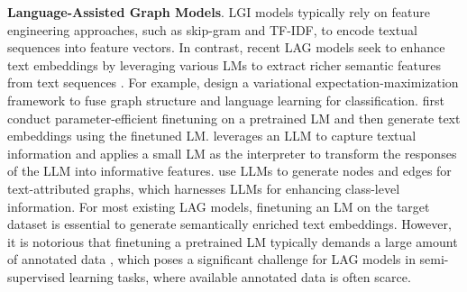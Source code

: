 \textbf{Language-Assisted Graph Models}.
LGI models typically rely on feature engineering approaches, such as skip-gram and TF-IDF, to encode textual sequences into feature vectors. 
In contrast, recent LAG models seek to enhance text embeddings by leveraging various LMs to extract richer semantic features from text sequences \citep{li2024surveygraphmeetslarge}.
For example, \cite{GLEM} design a variational expectation-maximization framework to fuse graph structure and language learning for classification.
\cite{duan2023simteg} first conduct parameter-efficient finetuning on a pretrained LM and then generate text embeddings using the finetuned LM. 
\cite{he2023harnessing} leverages an LLM to capture textual information and applies a small LM as the interpreter to transform the responses of the LLM into informative features. 
\cite{yu2023empower} use LLMs to generate nodes and edges for text-attributed graphs, which harnesses LLMs for enhancing class-level information.
For most existing LAG models, finetuning an LM on the target dataset is essential to generate semantically enriched text embeddings. 
However, it is notorious that finetuning a pretrained LM typically demands a large amount of annotated data \citep{GPT3}, which poses a significant challenge for LAG models in semi-supervised learning tasks, where available annotated data is often scarce.